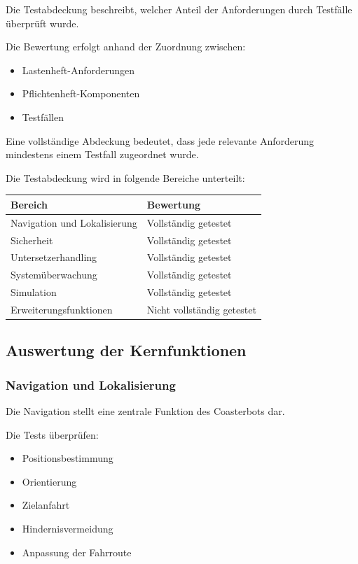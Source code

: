 Die Testabdeckung beschreibt, welcher Anteil der Anforderungen durch
Testfälle überprüft wurde.

Die Bewertung erfolgt anhand der Zuordnung zwischen:

\begin{itemize}
\tightlist
\item
  Lastenheft-Anforderungen
\item
  Pflichtenheft-Komponenten
\item
  Testfällen
\end{itemize}

Eine vollständige Abdeckung bedeutet, dass jede relevante Anforderung
mindestens einem Testfall zugeordnet wurde.

Die Testabdeckung wird in folgende Bereiche unterteilt:

\begin{longtable}[]{@{}ll@{}}
\toprule\noalign{}
Bereich & Bewertung \\
\midrule\noalign{}
\endhead
\bottomrule\noalign{}
\endlastfoot
Navigation und Lokalisierung & Vollständig getestet \\
Sicherheit & Vollständig getestet \\
Untersetzerhandling & Vollständig getestet \\
Systemüberwachung & Vollständig getestet \\
Simulation & Vollständig getestet \\
Erweiterungsfunktionen & Nicht vollständig getestet \\
\end{longtable}

\subsection{Auswertung der
Kernfunktionen}\label{auswertung-der-kernfunktionen}

\subsubsection{Navigation und
Lokalisierung}\label{navigation-und-lokalisierung}

Die Navigation stellt eine zentrale Funktion des Coasterbots dar.

Die Tests überprüfen:

\begin{itemize}
\tightlist
\item
  Positionsbestimmung
\item
  Orientierung
\item
  Zielanfahrt
\item
  Hindernisvermeidung
\item
  Anpassung der Fahrroute
\end{itemize}

